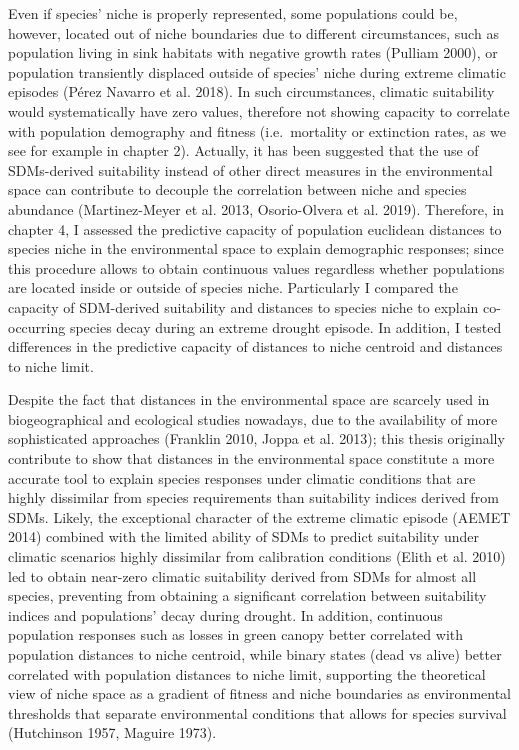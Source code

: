 \documentclass[11pt,twoside]{reedthesis}
\begin{document}
Even if species' niche is properly represented, some populations could
be, however, located out of niche boundaries due to different
circumstances, such as population living in sink habitats with negative
growth rates (Pulliam 2000), or population transiently displaced outside
of species' niche during extreme climatic episodes (Pérez Navarro et al.
2018). In such circumstances, climatic suitability would systematically
have zero values, therefore not showing capacity to correlate with
population demography and fitness (i.e.~mortality or extinction rates,
as we see for example in chapter 2). Actually, it has been suggested
that the use of SDMs-derived suitability instead of other direct
measures in the environmental space can contribute to decouple the
correlation between niche and species abundance (Martinez-Meyer et al.
2013, Osorio-Olvera et al. 2019). Therefore, in chapter 4, I assessed
the predictive capacity of population euclidean distances to species
niche in the environmental space to explain demographic responses; since
this procedure allows to obtain continuous values regardless whether
populations are located inside or outside of species niche. Particularly
I compared the capacity of SDM-derived suitability and distances to
species niche to explain co-occurring species decay during an extreme
drought episode. In addition, I tested differences in the predictive
capacity of distances to niche centroid and distances to niche limit.
\par

Despite the fact that distances in the environmental space are scarcely
used in biogeographical and ecological studies nowadays, due to the
availability of more sophisticated approaches (Franklin 2010, Joppa et
al. 2013); this thesis originally contribute to show that distances in
the environmental space constitute a more accurate tool to explain
species responses under climatic conditions that are highly dissimilar
from species requirements than suitability indices derived from SDMs.
Likely, the exceptional character of the extreme climatic episode (AEMET
2014) combined with the limited ability of SDMs to predict suitability
under climatic scenarios highly dissimilar from calibration conditions
(Elith et al. 2010) led to obtain near-zero climatic suitability derived
from SDMs for almost all species, preventing from obtaining a
significant correlation between suitability indices and populations'
decay during drought. In addition, continuous population responses such
as losses in green canopy better correlated with population distances to
niche centroid, while binary states (dead vs alive) better correlated
with population distances to niche limit, supporting the theoretical
view of niche space as a gradient of fitness and niche boundaries as
environmental thresholds that separate environmental conditions that
allows for species survival (Hutchinson 1957, Maguire 1973).\par
\end{document}
